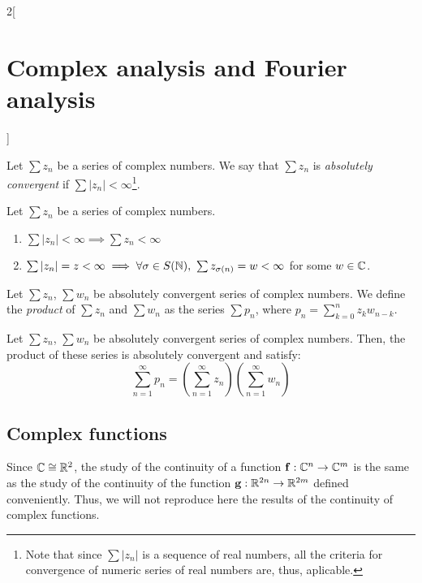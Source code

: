 \documentclass[../../../main.tex]{subfiles}
\begin{document}
\begin{multicols}{2}[\section{Complex analysis and Fourier analysis}]
\begin{prop}
\begin{enumerate}
    \end{enumerate}
  \end{prop}
  \begin{definition}
    Let $\sum z_n$ be a series of complex numbers. We say that $\sum z_n$ is \emph{absolutely convergent} if $\sum |z_n|<\infty$\footnote{Note that since $\sum |z_n|$ is a sequence of real numbers, all the criteria for convergence of numeric series of real numbers are, thus, aplicable.}.
  \end{definition}
  \begin{prop}
    Let $\sum z_n$ be a series of complex numbers.
    \begin{enumerate}
      \item $\sum |z_n|<\infty\implies\sum z_n<\infty$
      \item $\sum |z_n|=z<\infty\implies\forall\sigma\in S(\mathbb{N}),\ \sum z_{\sigma (n)}=w<\infty$ for some $w\in\mathbb{C}$.
    \end{enumerate}
  \end{prop}
  \begin{definition}
    Let $\sum z_n$, $\sum w_n$ be absolutely convergent series of complex numbers. We define the \emph{product} of $\sum z_n$ and $\sum w_n$ as the series $\sum p_n$, where $p_n=\sum_{k=0}^nz_kw_{n-k}$.
  \end{definition}
  \begin{prop}
    Let $\sum z_n$, $\sum w_n$ be absolutely convergent series of complex numbers. Then, the product of these series is absolutely convergent and satisfy: $$\sum_{n=1}^\infty p_n=\left(\sum_{n=1}^\infty z_n\right)\left(\sum_{n=1}^\infty w_n\right)$$
  \end{prop}
  \subsection{Complex functions}
  Since $\mathbb{C}\cong\mathbb{R}^2$, the study of the continuity of a function $\boldsymbol{\mathrm{f}}:\mathbb{C}^n\rightarrow\mathbb{C}^m$ is the same as the study of the continuity of the function $\boldsymbol{\mathrm{g}}:\mathbb{R}^{2n}\rightarrow\mathbb{R}^{2m}$ defined conveniently. Thus, we will not reproduce here the results of the continuity of complex functions.

\end{multicols}
\end{document}
